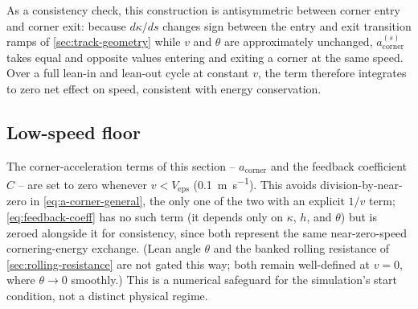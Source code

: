As a consistency check, this construction is antisymmetric between corner entry
and corner exit: because $d\kappa/ds$ changes sign between the entry and exit
transition ramps of \cref{sec:track-geometry} while $v$ and $\theta$ are
approximately unchanged, $a_{\mathrm{corner}}^{(s)}$ takes equal and opposite
values entering and exiting a corner at the same speed. Over a full lean-in and
lean-out cycle at constant $v$, the term therefore integrates to zero net effect
on speed, consistent with energy conservation.

\subsection{Low-speed floor}
\label{sec:v-eps}

The corner-acceleration terms of this section -- $a_{\mathrm{corner}}$ and the
feedback coefficient $C$ -- are set to zero whenever $v < V_{\mathrm{eps}}$
(\SI{0.1}{\metre\per\second}). This avoids division-by-near-zero in
\cref{eq:a-corner-general}, the only one of the two with an explicit $1/v$
term; \cref{eq:feedback-coeff} has no such term (it depends only on $\kappa$,
$h$, and $\theta$) but is zeroed alongside it for consistency, since both
represent the same near-zero-speed cornering-energy exchange. (Lean angle
$\theta$ and the banked rolling resistance of \cref{sec:rolling-resistance} are
not gated this way; both remain well-defined at $v = 0$, where $\theta \to 0$
smoothly.) This is a numerical safeguard for the simulation's start condition,
not a distinct physical regime.
